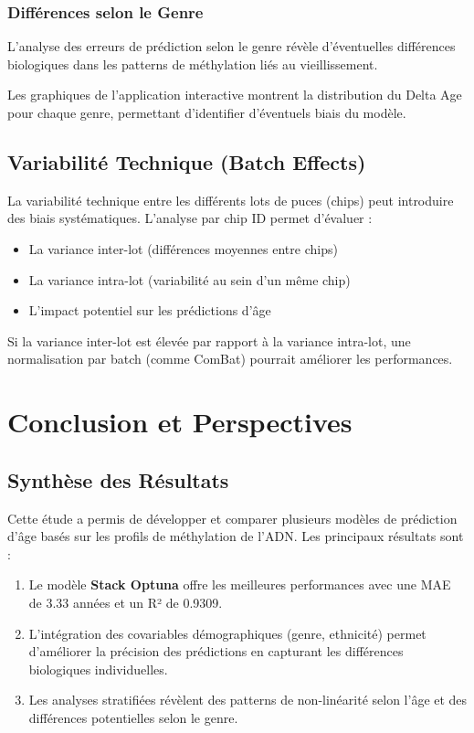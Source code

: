 \documentclass[11pt,a4paper]{article}
\begin{document}
\subsubsection{Différences selon le Genre}

L'analyse des erreurs de prédiction selon le genre révèle d'éventuelles différences 
biologiques dans les patterns de méthylation liés au vieillissement.

Les graphiques de l'application interactive montrent la distribution du Delta Age 
pour chaque genre, permettant d'identifier d'éventuels biais du modèle.


\subsection{Variabilité Technique (Batch Effects)}

La variabilité technique entre les différents lots de puces (chips) peut introduire 
des biais systématiques. L'analyse par chip ID permet d'évaluer :

\begin{itemize}
    \item La variance inter-lot (différences moyennes entre chips)
    \item La variance intra-lot (variabilité au sein d'un même chip)
    \item L'impact potentiel sur les prédictions d'âge
\end{itemize}

Si la variance inter-lot est élevée par rapport à la variance intra-lot, une 
normalisation par batch (comme ComBat) pourrait améliorer les performances.

\section{Conclusion et Perspectives}

\subsection{Synthèse des Résultats}

Cette étude a permis de développer et comparer plusieurs modèles de prédiction d'âge 
basés sur les profils de méthylation de l'ADN. Les principaux résultats sont :

\begin{enumerate}
    \item Le modèle \textbf{Stack Optuna} offre les meilleures performances avec une 
          MAE de 3.33 années et un R² de 0.9309.
    
    \item L'intégration des covariables démographiques (genre, ethnicité) permet 
          d'améliorer la précision des prédictions en capturant les différences 
          biologiques individuelles.
    
    \item Les analyses stratifiées révèlent des patterns de non-linéarité selon l'âge 
          et des différences potentielles selon le genre.
\end{enumerate}
\end{document}
